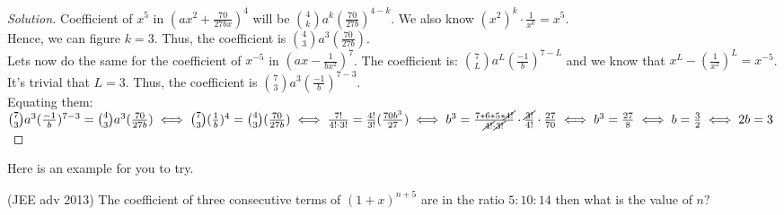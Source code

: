 \begin{proof}
    [Solution]
    Coefficient of $x^5$ in $(ax^2+\frac{70}{27bx})^4$ will be $\binom{4}{k} a^k (\frac{70}{27b})^{4-k}$. We also know $(x^2)^k \cdot \frac{1}{x^k}=x^5$.\\
    Hence, we can figure $k=3$. Thus, the coefficient is $\binom{4}{3} a^3 (\frac{70}{27b})$.\\
    Lets now do the same for the coefficient of $x^{-5}$ in $(ax-\frac{1}{bx^2})^7$. The coefficient is: $\binom{7}{L} a^L (\frac{-1}{b})^{7-L}$ and we know that $x^L-(\frac{1}{x^2})^L=x^{-5}$.\\
    It's trivial that $L=3$. Thus, the coefficient is $\binom{7}{3} a^3 (\frac{-1}{b})^{7-3}$.\\
    Equating them: $\binom{7}{3} a^3 (\frac{-1}{b})^{7-3} = \binom{4}{3} a^3 (\frac{70}{27b})\\
    \iff \binom{7}{3} (\frac{1}{b})^{4} = \binom{4}{3} (\frac{70}{27b})\\
    \iff \frac{7!}{4! \cdot 3!} = \frac{4!}{3!} (\frac{70b^3}{27})\\
    \iff b^3=\frac{7*6*5*\cancel{4!}}{\cancel{4!} \cdot \cancel{3!}} \cdot \frac{\cancel{3!}}{4!} \cdot \frac{27}{70}\\
    \iff b^3=\frac{27}{8}\\
    \iff b=\frac{3}{2}\\
    \iff 2b=3$
\end{proof}
Here is an example for you to try.
\begin{example}
    (JEE adv 2013) The coefficient of three consecutive terms of $(1+x)^{n+5}$ are in the ratio $5:10:14$ then what is the value of $n?$
\end{example}
